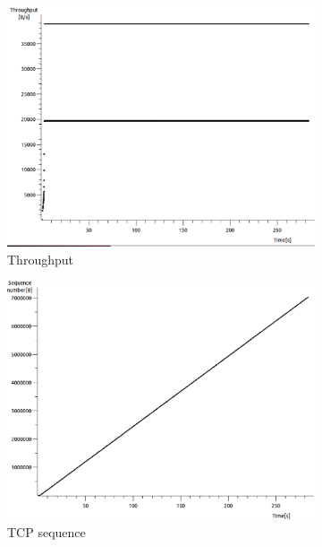 \documentclass[conference,a4paper]{IEEEtran}
\begin{document}
\begin{figure}
 \centering
 \begin{subfigure}[b]{0.2\textwidth}
  \includegraphics[width=\textwidth]{s7-1_th}
  \caption{Throughput}
 \end{subfigure}
 \begin{subfigure}[b]{0.2\textwidth}
  \includegraphics[width=\textwidth]{s7-1_seq}
  \caption{TCP sequence}
 \end{subfigure}
 \begin{subfigure}[b]{0.2\textwidth}

\end{subfigure}
\end{figure}
\end{document}
